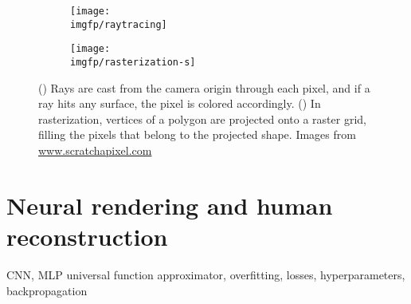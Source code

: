 \begin{figure}[h!]
	\centering
	\begin{subfigure}[b]{0.49\textwidth}
		\centering
		\texttt{[image: \\imgfp/raytracing]}
		\caption{}
		\label{lit:fig:raytracing}
	\end{subfigure}
	\hfill
	\begin{subfigure}[b]{0.49\textwidth}
		\centering
		\texttt{[image: \\imgfp/rasterization-s]}
		\caption{}
		\label{lit:fig:rasterization}
	\end{subfigure}
	
	\caption{(\protect{}) Rays are cast from the camera origin through each pixel, and if a ray hits any surface, the pixel is colored accordingly. (\protect{}) In rasterization, vertices of a polygon are projected onto a raster grid, filling the pixels that belong to the projected shape. Images from \href{https://www.scratchapixel.com/}{www.scratchapixel.com}}
	\label{lit:fig:rendering-methods}
\end{figure}

\section{Neural rendering and human reconstruction}
\alert{CNN, MLP universal function approximator, overfitting, losses, hyperparameters, backpropagation}
	
